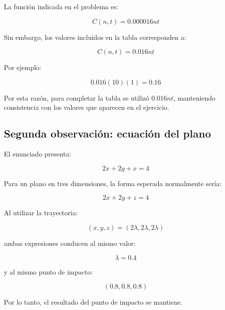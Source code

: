 \documentclass[12pt,a4paper]{article}
\begin{document}
La función indicada en el problema es:

\[C(n,t)=0.000016nt\]

Sin embargo, los valores incluidos en la tabla corresponden a:

\[C(n,t)=0.016nt\]

Por ejemplo:

\[0.016(10)(1)=0.16\]

Por esta razón, para completar la tabla se utilizó $0.016nt$,
manteniendo consistencia con los valores que aparecen en el ejercicio.

\subsection{Segunda observación: ecuación del plano}

El enunciado presenta:

\[2x+2y+x=4\]

Para un plano en tres dimensiones, la forma esperada normalmente
sería:

\[2x+2y+z=4\]

Al utilizar la trayectoria:

\[(x,y,z)=(2\lambda,2\lambda,2\lambda)\]

ambas expresiones conducen al mismo valor:

\[\lambda=0.4\]

y al mismo punto de impacto:

\[\boxed{(0.8,0.8,0.8)}\]

Por lo tanto, el resultado del punto de impacto se mantiene.
\end{document}
